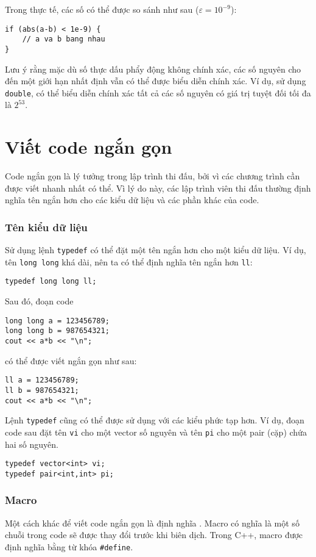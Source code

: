 Trong thực tế, các số có thể được so sánh
như sau ($\varepsilon=10^{-9}$):

\begin{lstlisting}
if (abs(a-b) < 1e-9) {
    // a va b bang nhau
}
\end{lstlisting}

Lưu ý rằng mặc dù số thực dấu phẩy động không chính xác,
các số nguyên cho đến một giới hạn nhất định vẫn có thể
được biểu diễn chính xác.
Ví dụ, sử dụng \texttt{double},
có thể biểu diễn chính xác tất cả
các số nguyên có giá trị tuyệt đối tối đa là $2^{53}$.

\section{Viết code ngắn gọn}

Code ngắn gọn là lý tưởng trong lập trình thi đấu,
bởi vì các chương trình cần được viết
nhanh nhất có thể.
Vì lý do này, các lập trình viên thi đấu thường định nghĩa
tên ngắn hơn cho các kiểu dữ liệu và các phần khác của code.

\subsubsection{Tên kiểu dữ liệu}
Sử dụng lệnh \texttt{typedef}
có thể đặt một tên ngắn hơn
cho một kiểu dữ liệu.
Ví dụ, tên \texttt{long long} khá dài,
nên ta có thể định nghĩa tên ngắn hơn \texttt{ll}:
\begin{lstlisting}
typedef long long ll;
\end{lstlisting}
Sau đó, đoạn code
\begin{lstlisting}
long long a = 123456789;
long long b = 987654321;
cout << a*b << "\n";
\end{lstlisting}
có thể được viết ngắn gọn như sau:
\begin{lstlisting}
ll a = 123456789;
ll b = 987654321;
cout << a*b << "\n";
\end{lstlisting}

Lệnh \texttt{typedef}
cũng có thể được sử dụng với các kiểu phức tạp hơn.
Ví dụ, đoạn code sau đặt
tên \texttt{vi} cho một vector số nguyên
và tên \texttt{pi} cho một pair (cặp)
chứa hai số nguyên.
\begin{lstlisting}
typedef vector<int> vi;
typedef pair<int,int> pi;
\end{lstlisting}

\subsubsection{Macro}
Một cách khác để viết code ngắn gọn là định nghĩa
.
Macro có nghĩa là một số chuỗi trong
code sẽ được thay đổi trước khi biên dịch.
Trong C++, macro được định nghĩa bằng từ khóa
\texttt{\#define}.

